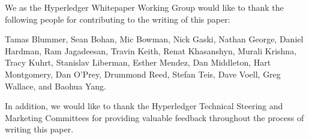 We as the Hyperledger Whitepaper Working Group would like to thank the following people for contributing to the writing of this paper:

Tamas Blummer, Sean Bohan, Mic Bowman, Nick Gaski, Nathan George, Daniel Hardman, Ram Jagadeesan, Travin Keith, Renat Khasanshyn, Murali Krishna, Tracy Kuhrt, Stanislav Liberman, Esther Mendez, Dan Middleton, Hart Montgomery, Dan O'Prey, Drummond Reed, Stefan Teis, Dave Voell, Greg Wallace, and Baohua Yang.

In addition, we would like to thank the Hyperledger Technical Steering and Marketing Committees for providing valuable feedback throughout the process of writing this paper.
